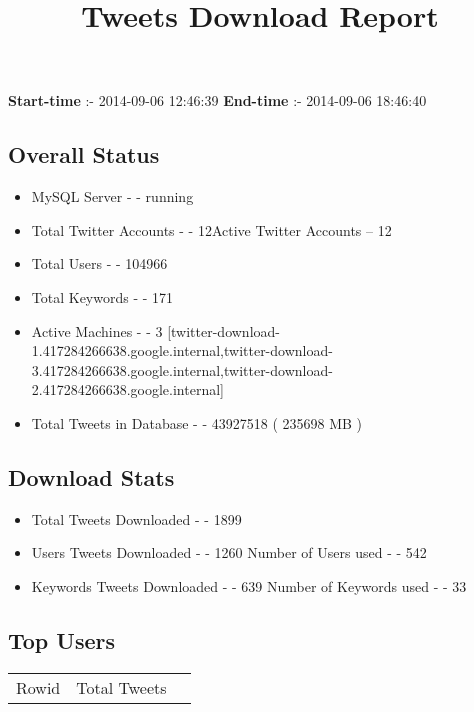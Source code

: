 \documentclass{article}\usepackage[T1]{fontenc}
\begin{document}
\title{\textbf{Tweets Download Report}}
               \date{}
                \maketitle
               \centerline{\textbf{Start-time} :- 2014-09-06 12:46:39 \hspace{40pt} \textbf{End-time} :- 2014-09-06 18:46:40}               \subsection*{Overall Status}                \begin{itemize}                \item MySQL Server - - running               \item Total Twitter Accounts - - 12\newline Active Twitter Accounts -- 12               \item Total Users - - 104966               \item Total Keywords - - 171               \item Active Machines - - 3 [twitter-download-1.417284266638.google.internal,twitter-download-3.417284266638.google.internal,twitter-download-2.417284266638.google.internal]               \item Total Tweets in Database - - 43927518 ( 235698 MB )               \end{itemize}               \subsection*{Download Stats}                \begin{itemize}                \item Total Tweets Downloaded - - 1899               \item Users Tweets Downloaded - - 1260 \newline Number of Users used - - 542               \item Keywords Tweets Downloaded - - 639 \newline Number of Keywords used - - 33              \end{itemize}              \subsection*{Top Users}\begin{tabular}{|c|c|c|}         \hline         Rowid & Total Tweets \\ 

\end{tabular}
\end{document}
